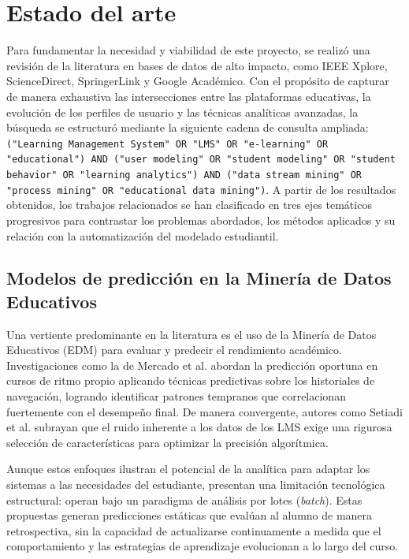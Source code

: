 \section{Estado del arte}
Para fundamentar la necesidad y viabilidad de este proyecto, se realizó una revisión de la literatura en bases de datos de alto impacto, como IEEE Xplore, ScienceDirect, SpringerLink y Google Académico. Con el propósito de capturar de manera exhaustiva las intersecciones entre las plataformas educativas, la evolución de los perfiles de usuario y las técnicas analíticas avanzadas, la búsqueda se estructuró mediante la siguiente cadena de consulta ampliada: \texttt{("Learning Management System" OR "LMS" OR "e-learning" OR "educational") AND ("user modeling" OR "student modeling" OR "student behavior" OR "learning analytics") AND ("data stream mining" OR "process mining" OR "educational data mining")}. A partir de los resultados obtenidos, los trabajos relacionados se han clasificado en tres ejes temáticos progresivos para contrastar los problemas abordados, los métodos aplicados y su relación con la automatización del modelado estudiantil.

\subsection{Modelos de predicción en la Minería de Datos Educativos}
Una vertiente predominante en la literatura es el uso de la Minería de Datos Educativos (EDM) para evaluar y predecir el rendimiento académico. Investigaciones como la de Mercado et al. \cite{Mercado2024} abordan la predicción oportuna en cursos de ritmo propio aplicando técnicas predictivas sobre los historiales de navegación, logrando identificar patrones tempranos que correlacionan fuertemente con el desempeño final. De manera convergente, autores como Setiadi et al. \cite{Setiadi2025} subrayan que el ruido inherente a los datos de los LMS exige una rigurosa selección de características para optimizar la precisión algorítmica. 

Aunque estos enfoques ilustran el potencial de la analítica para adaptar los sistemas a las necesidades del estudiante, presentan una limitación tecnológica estructural: operan bajo un paradigma de análisis por lotes (\textit{batch}). Estas propuestas generan predicciones estáticas que evalúan al alumno de manera retrospectiva, sin la capacidad de actualizarse continuamente a medida que el comportamiento y las estrategias de aprendizaje evolucionan a lo largo del curso.

